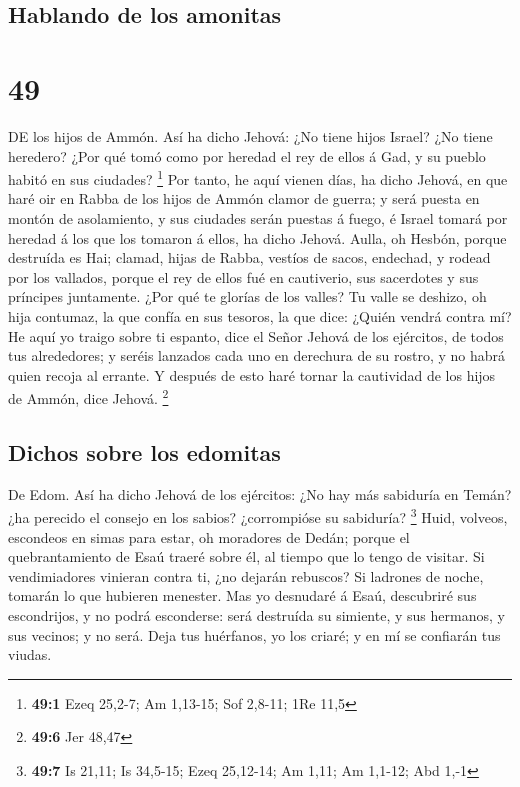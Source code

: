 \hypertarget{hablando-de-los-amonitas}{%
\subsection{Hablando de los amonitas}\label{hablando-de-los-amonitas}}

\hypertarget{section-48}{%
\section{49}\label{section-48}}

 DE los hijos de Ammón. Así ha dicho Jehová: ¿No tiene hijos
Israel? ¿No tiene heredero? ¿Por qué tomó como por heredad el rey de
ellos á Gad, y su pueblo habitó en sus ciudades? \footnote{\textbf{49:1}
  Ezeq 25,2-7; Am 1,13-15; Sof 2,8-11; 1Re 11,5}  Por tanto,
he aquí vienen días, ha dicho Jehová, en que haré oir en Rabba de los
hijos de Ammón clamor de guerra; y será puesta en montón de asolamiento,
y sus ciudades serán puestas á fuego, é Israel tomará por heredad á los
que los tomaron á ellos, ha dicho Jehová.  Aulla, oh Hesbón,
porque destruída es Hai; clamad, hijas de Rabba, vestíos de sacos,
endechad, y rodead por los vallados, porque el rey de ellos fué en
cautiverio, sus sacerdotes y sus príncipes juntamente.  ¿Por
qué te glorías de los valles? Tu valle se deshizo, oh hija contumaz, la
que confía en sus tesoros, la que dice: ¿Quién vendrá contra mí?
 He aquí yo traigo sobre ti espanto, dice el Señor Jehová de
los ejércitos, de todos tus alrededores; y seréis lanzados cada uno en
derechura de su rostro, y no habrá quien recoja al errante. 
Y después de esto haré tornar la cautividad de los hijos de Ammón, dice
Jehová. \footnote{\textbf{49:6} Jer 48,47}

\hypertarget{dichos-sobre-los-edomitas}{%
\subsection{Dichos sobre los edomitas}\label{dichos-sobre-los-edomitas}}

 De Edom. Así ha dicho Jehová de los ejércitos: ¿No hay más
sabiduría en Temán? ¿ha perecido el consejo en los sabios? ¿corrompióse
su sabiduría? \footnote{\textbf{49:7} Is 21,11; Is 34,5-15; Ezeq
  25,12-14; Am 1,11; Am 1,1-12; Abd 1,-1}  Huid, volveos,
escondeos en simas para estar, oh moradores de Dedán; porque el
quebrantamiento de Esaú traeré sobre él, al tiempo que lo tengo de
visitar.  Si vendimiadores vinieran contra ti, ¿no dejarán
rebuscos? Si ladrones de noche, tomarán lo que hubieren menester.
 Mas yo desnudaré á Esaú, descubriré sus escondrijos, y no
podrá esconderse: será destruída su simiente, y sus hermanos, y sus
vecinos; y no será.  Deja tus huérfanos, yo los criaré; y
en mí se confiarán tus viudas.


